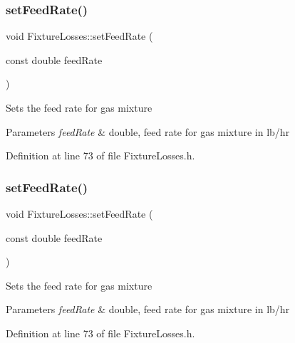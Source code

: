 \subsubsection{\texorpdfstring{set\+Feed\+Rate()}{setFeedRate()}\hspace{0.1cm}{\footnotesize\ttfamily [1/3]}}
{\footnotesize\ttfamily void Fixture\+Losses\+::set\+Feed\+Rate (\begin{DoxyParamCaption}\item[{const double}]{feed\+Rate }\end{DoxyParamCaption})\hspace{0.3cm}{\ttfamily [inline]}}

Sets the feed rate for gas mixture 
\begin{DoxyParams}{Parameters}
{\em feed\+Rate} & double, feed rate for gas mixture in lb/hr \\
\hline
\end{DoxyParams}


Definition at line 73 of file Fixture\+Losses.\+h.

\mbox{\label{class_fixture_losses_a6543643db6b28f3a78397c97d9c5135f}} 
\subsubsection{\texorpdfstring{set\+Feed\+Rate()}{setFeedRate()}\hspace{0.1cm}{\footnotesize\ttfamily [2/3]}}
{\footnotesize\ttfamily void Fixture\+Losses\+::set\+Feed\+Rate (\begin{DoxyParamCaption}\item[{const double}]{feed\+Rate }\end{DoxyParamCaption})\hspace{0.3cm}{\ttfamily [inline]}}

Sets the feed rate for gas mixture 
\begin{DoxyParams}{Parameters}
{\em feed\+Rate} & double, feed rate for gas mixture in lb/hr \\
\hline
\end{DoxyParams}


Definition at line 73 of file Fixture\+Losses.\+h.

\mbox{\label{class_fixture_losses_a6543643db6b28f3a78397c97d9c5135f}} 
